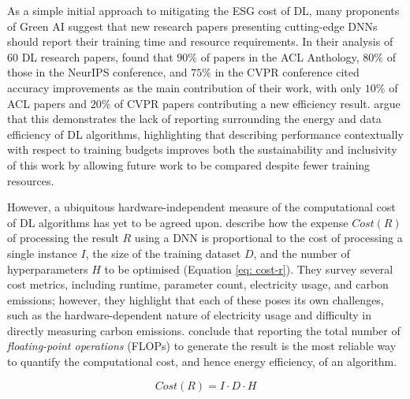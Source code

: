 \documentclass[a4paper, 11pt]{report}
\begin{document}
    As a simple initial approach to mitigating the ESG cost of DL, many proponents of Green AI suggest that new research papers presenting cutting-edge DNNs should report their training time and resource requirements. In their analysis of 60 DL research papers, \citet{schwartz-2019} found that $90\%$ of papers in the ACL Anthology, $80\%$ of those in the NeurIPS conference, and $75\%$ in the CVPR conference cited accuracy improvements as the main contribution of their work, with only $10\%$ of ACL papers and $20\%$ of CVPR papers contributing a new efficiency result. \citet{schwartz-2019} argue that this demonstrates the lack of reporting surrounding the energy and data efficiency of DL algorithms, highlighting that describing performance contextually with respect to training budgets improves both the sustainability and inclusivity of this work by allowing future work to be compared despite fewer training resources.

    However, a ubiquitous hardware-independent measure of the computational cost of DL algorithms has yet to be agreed upon. \citet{schwartz-2019} describe how the expense $Cost(R)$ of processing the result $R$ using a DNN is proportional to the cost of processing a single instance $I$, the size of the training dataset $D$, and the number of hyperparameters $H$ to be optimised (Equation \ref{eq: cost-r}). They survey several cost metrics, including runtime, parameter count, electricity usage, and carbon emissions; however, they highlight that each of these poses its own challenges, such as the hardware-dependent nature of electricity usage and difficulty in directly measuring carbon emissions. \citet{schwartz-2019} conclude that reporting the total number of \emph{floating-point operations} (FLOPs) to generate the result is the most reliable way to quantify the computational cost, and hence energy efficiency, of an algorithm.

    \begin{equation}
        \label{eq: cost-r}
        Cost(R) = I \cdot D \cdot H
    \end{equation}
\end{document}
